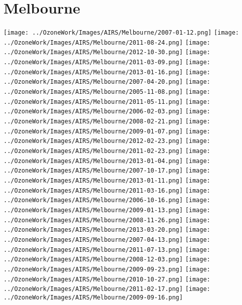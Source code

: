 \section{Melbourne}
  \texttt{[image: ../OzoneWork/Images/AIRS/Melbourne/2007-01-12.png]}
  \texttt{[image: ../OzoneWork/Images/AIRS/Melbourne/2011-08-24.png]}
  \texttt{[image: ../OzoneWork/Images/AIRS/Melbourne/2012-10-30.png]}
  \texttt{[image: ../OzoneWork/Images/AIRS/Melbourne/2011-03-09.png]}
  \texttt{[image: ../OzoneWork/Images/AIRS/Melbourne/2013-01-16.png]}
  \texttt{[image: ../OzoneWork/Images/AIRS/Melbourne/2007-04-20.png]}
  \texttt{[image: ../OzoneWork/Images/AIRS/Melbourne/2005-11-08.png]}
  \texttt{[image: ../OzoneWork/Images/AIRS/Melbourne/2011-05-11.png]}
  \texttt{[image: ../OzoneWork/Images/AIRS/Melbourne/2006-02-03.png]}
  \texttt{[image: ../OzoneWork/Images/AIRS/Melbourne/2008-02-21.png]}
  \texttt{[image: ../OzoneWork/Images/AIRS/Melbourne/2009-01-07.png]}
  \texttt{[image: ../OzoneWork/Images/AIRS/Melbourne/2012-02-23.png]}
  \texttt{[image: ../OzoneWork/Images/AIRS/Melbourne/2011-02-23.png]}
  \texttt{[image: ../OzoneWork/Images/AIRS/Melbourne/2013-01-04.png]}
  \texttt{[image: ../OzoneWork/Images/AIRS/Melbourne/2007-10-17.png]}
  \texttt{[image: ../OzoneWork/Images/AIRS/Melbourne/2013-01-11.png]}
  \texttt{[image: ../OzoneWork/Images/AIRS/Melbourne/2011-03-16.png]}
  \texttt{[image: ../OzoneWork/Images/AIRS/Melbourne/2006-10-16.png]}
  \texttt{[image: ../OzoneWork/Images/AIRS/Melbourne/2009-01-13.png]}
  \texttt{[image: ../OzoneWork/Images/AIRS/Melbourne/2008-11-26.png]}
  \texttt{[image: ../OzoneWork/Images/AIRS/Melbourne/2013-03-20.png]}
  \texttt{[image: ../OzoneWork/Images/AIRS/Melbourne/2007-04-13.png]}
  \texttt{[image: ../OzoneWork/Images/AIRS/Melbourne/2011-07-13.png]}
  \texttt{[image: ../OzoneWork/Images/AIRS/Melbourne/2008-12-03.png]}
  \texttt{[image: ../OzoneWork/Images/AIRS/Melbourne/2009-09-23.png]}
  \texttt{[image: ../OzoneWork/Images/AIRS/Melbourne/2010-10-27.png]}
  \texttt{[image: ../OzoneWork/Images/AIRS/Melbourne/2011-02-17.png]}
  \texttt{[image: ../OzoneWork/Images/AIRS/Melbourne/2009-09-16.png]}
